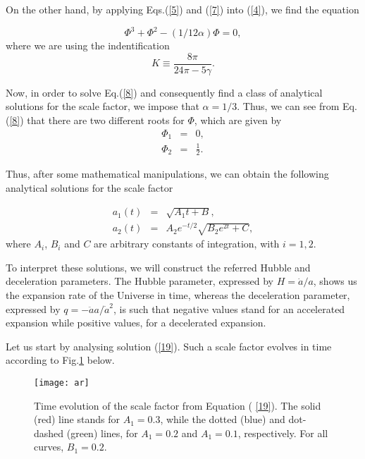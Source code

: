 On the other hand, by applying Eqs.(\ref{5}) and (\ref{7}) into (\ref{4}),
we find the equation

\begin{equation}
\Phi ^{3}+\Phi ^{2}-(1/12\alpha )\Phi =0,  \label{8}
\end{equation}%
\noindent where we are using the indentification 
\begin{equation}
K\equiv \frac{8\pi }{24\pi -5\gamma }.  \label{11}
\end{equation}



Now, in order to solve Eq.(\ref{8}) and consequently find a class
of analytical solutions for the scale factor, we impose that $\alpha =1/3$.
Thus, we can see from Eq.(\ref{8}) that there are two different roots for $%
\Phi $, which are given by 
\begin{eqnarray}
\Phi _{1} &=&0,  \label{q1} \\
\Phi _{2} &=&\frac{1}{2}.  \label{q2}
\end{eqnarray}

Thus, after some mathematical manipulations, we can obtain the following
analytical solutions for the scale factor

\begin{eqnarray}
a_{1}(t) &=&\sqrt{A_{1}t+B},  \label{19} \\
a_{2}(t) &=&A_{2}e^{-t/2}\sqrt{B_{2}e^{2t}+C}, \label{20}
\end{eqnarray}%
\noindent where $A_{i}$, $B_{i}$ and $C$ are arbitrary constants of integration, with $i=1,2$.

To interpret these solutions, we will construct the referred Hubble and deceleration parameters. The Hubble parameter, expressed by $H=\dot{a}/a$, shows us the expansion rate of the Universe in time, whereas the deceleration parameter, expressed by $q=-\ddot{a}a/\dot{a}^{2}$, is such that negative values stand for an accelerated expansion while positive values, for a decelerated expansion.

Let us start by  analysing solution (\ref{19}). Such a scale factor evolves in time according to Fig.\ref{fig1} below.

\begin{figure}[ht!]
\vspace{0.3cm} \centering
\texttt{[image: ar]}
\caption{Time evolution of the scale factor from Equation (%
\protect\ref{19}). The solid (red) line stands for $A_1=0.3$, while the dotted (blue) and dot-dashed (green) lines, for $A_1=0.2$ and $A_1=0.1$, respectively. For all curves, $B_1=0.2$.}
\label{fig1}
\end{figure}

